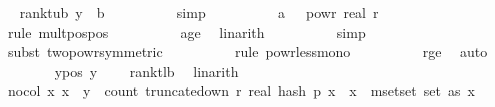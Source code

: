 \begin{isabellebody}
\ \isamarkupfalse%
\ rank{\isacharunderscore}{\kern0pt}t{\isacharunderscore}{\kern0pt}ub{\isacharprime}{\kern0pt}{\isacharcolon}{\kern0pt}\ {\isachardoublequoteopen}y{\isacharprime}{\kern0pt}\ {\isasymle}\ b{\isachardoublequoteclose}\isanewline
\ \ \ \ \ \ \ \ \isamarkupfalse%
\ simp\isanewline
\isanewline
\ \ \ \ \ \ \isamarkupfalse%
\ {\isachardoublequoteopen}{}\ {\isacharless}{\kern0pt}\ {\isacharparenleft}{\kern0pt}a{\isacharplus}{\kern0pt}{}{\isacharparenright}{\kern0pt}\ {\isacharasterisk}{\kern0pt}\ {\isacharparenleft}{\kern0pt}{}{\isacharminus}{\kern0pt}{}\ powr\ {\isacharparenleft}{\kern0pt}{\isacharminus}{\kern0pt}real\ r{\isacharparenright}{\kern0pt}{\isacharparenright}{\kern0pt}{\isachardoublequoteclose}\isanewline
\ \ \ \ \ \ \ \ \isamarkupfalse%
\ {\isacharparenleft}{\kern0pt}rule\ mult{\isacharunderscore}{\kern0pt}pos{\isacharunderscore}{\kern0pt}pos{\isacharparenright}{\kern0pt}\isanewline
\ \ \ \ \ \ \ \ \isamarkupfalse%
\ a{\isacharunderscore}{\kern0pt}ge{\isacharunderscore}{\kern0pt}{}\ \isamarkupfalse%
\ linarith\isanewline
\ \ \ \ \ \ \ \ \isamarkupfalse%
\ simp\isanewline
\ \ \ \ \ \ \ \ \isamarkupfalse%
\ {\isacharparenleft}{\kern0pt}subst\ two{\isacharunderscore}{\kern0pt}powr{\isacharunderscore}{\kern0pt}{}{\isacharbrackleft}{\kern0pt}symmetric{\isacharbrackright}{\kern0pt}{\isacharparenright}{\kern0pt}\isanewline
\ \ \ \ \ \ \ \ \isamarkupfalse%
\ {\isacharparenleft}{\kern0pt}rule\ powr{\isacharunderscore}{\kern0pt}less{\isacharunderscore}{\kern0pt}mono{\isacharparenright}{\kern0pt}\isanewline
\ \ \ \ \ \ \ \ \isamarkupfalse%
\ r{\isacharunderscore}{\kern0pt}ge{\isacharunderscore}{\kern0pt}{}\ \isamarkupfalse%
\ auto\isanewline
\ \ \ \ \ \ \isamarkupfalse%
\ y{\isacharprime}{\kern0pt}{\isacharunderscore}{\kern0pt}pos{\isacharcolon}{\kern0pt}\ {\isachardoublequoteopen}y{\isacharprime}{\kern0pt}\ {\isachargreater}{\kern0pt}\ {}{\isachardoublequoteclose}\ \isamarkupfalse%
\ rank{\isacharunderscore}{\kern0pt}t{\isacharunderscore}{\kern0pt}lb{\isacharprime}{\kern0pt}\ \isamarkupfalse%
\ linarith\isanewline
\isanewline
\ \ \ \ \ \ \isamarkupfalse%
\ no{\isacharunderscore}{\kern0pt}col{\isacharprime}{\kern0pt}{\isacharcolon}{\kern0pt}\ {\isachardoublequoteopen}{\isasymAnd}x{\isachardot}{\kern0pt}\ x\ {\isasymle}\ y{\isacharprime}{\kern0pt}\ {\isasymLongrightarrow}\ count\ {\isacharbraceleft}{\kern0pt}{\isacharhash}{\kern0pt}truncate{\isacharunderscore}{\kern0pt}down\ r\ {\isacharparenleft}{\kern0pt}real\ {\isacharparenleft}{\kern0pt}hash\ p\ x\ {\isasymomega}{\isacharparenright}{\kern0pt}{\isacharparenright}{\kern0pt}{\isachardot}{\kern0pt}\ x\ {\isasymin}{\isacharhash}{\kern0pt}\ mset{\isacharunderscore}{\kern0pt}set\ {\isacharparenleft}{\kern0pt}set\ as{\isacharparenright}{\kern0pt}{\isacharhash}{\kern0pt}{\isacharbraceright}{\kern0pt}\ x\ {\isasymle}\ {}{\isachardoublequoteclose}\isanewline

\end{isabellebody}
